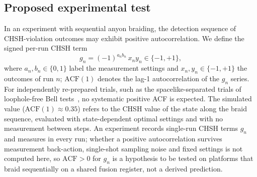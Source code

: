 \documentclass[aps,pra,twocolumn,superscriptaddress,longbibliography,floatfix,nofootinbib]{revtex4-2}
\begin{document}
\subsection{Proposed experimental test}

In an experiment with sequential anyon braiding, the detection
sequence of CHSH-violation outcomes may exhibit positive
autocorrelation. We define the signed per-run CHSH term
\begin{equation}
g_n = (-1)^{a_n b_n}\, x_n y_n \in \{-1,+1\},
\end{equation}
where $a_n,b_n\in\{0,1\}$ label the measurement settings and
$x_n,y_n\in\{-1,+1\}$ the outcomes of run $n$; $\text{ACF}(1)$ denotes
the lag-1 autocorrelation of the $g_n$ series.
For independently re-prepared trials, such as the spacelike-separated
trials of loophole-free Bell
tests~\cite{Hensen2015,Giustina2015,Shalm2015}, no systematic positive
ACF is expected. The simulated value ($\text{ACF}(1)\approx 0.35$)
refers to the CHSH value of the state along the braid sequence,
evaluated with state-dependent optimal settings and with no measurement
between steps. An experiment records single-run CHSH terms $g_n$ and
measures in every run; whether a positive autocorrelation survives
measurement back-action, single-shot sampling noise and fixed settings
is not computed here, so $\text{ACF}>0$ for $g_n$ is a hypothesis to be
tested on platforms that braid sequentially on a shared fusion register,
not a derived prediction.
\end{document}
